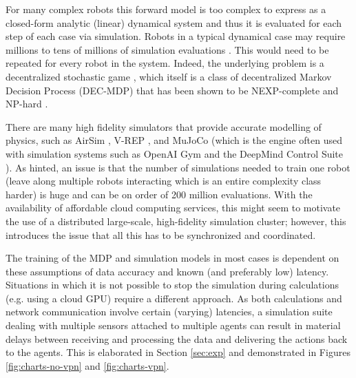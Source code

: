 \documentclass{article}
\let\cite\citep
\begin{document}
For many complex robots this forward model is too complex to express as a closed-form analytic (linear) dynamical system and thus it is evaluated for each step of each case via simulation.  Robots in a typical dynamical case may require millions to tens of millions of simulation evaluations \cite{SAC}.   This would need to be repeated for every robot in the system.   Indeed, the underlying problem is a decentralized stochastic game \cite{redulla2018simulating}, which itself is a class of decentralized Markov Decision Process (DEC-MDP) that has been shown to be NEXP-complete and NP-hard \cite{papadimitriou1986intractable, bernstein2002complexity}.

There are many high fidelity simulators that provide accurate modelling of physics, such as AirSim \cite{shah2018airsim}, V-REP \cite{rohmer2013v}, and MuJoCo \cite{Todorov2012MuJoCo} (which is the engine often used with simulation systems such as OpenAI Gym \cite{Brockman2016Gym} and the DeepMind Control Suite \cite{Tassa2018DMC}).  As hinted, an issue is that the number of simulations needed to train one robot (leave along multiple robots interacting which is an entire complexity class harder) is huge and can be on order of 200 million evaluations.  With the availability of affordable cloud computing services, this might seem to motivate the use of a distributed large-scale, high-fidelity simulation cluster; however, this introduces the issue that all this has to be synchronized and coordinated.

The training of the MDP and simulation models in most cases is dependent on these assumptions of data accuracy and known (and preferably low) latency.  Situations in which it is not possible to stop the simulation during calculations (e.g. using a cloud GPU) require a different approach. %
As both calculations and network communication involve certain (varying) latencies, a simulation suite dealing with multiple sensors attached to multiple agents can result in material delays between receiving and processing the data and delivering the actions back to the agents.   This is elaborated in Section \ref{sec:exp} and demonstrated in Figures \ref{fig:charts-no-vpn} and \ref{fig:charts-vpn}.

\end{document}
